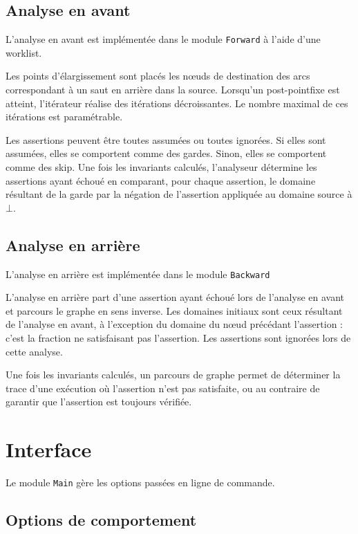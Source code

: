 \documentclass{article}
\begin{document}
\subsection{Analyse en avant}

L'analyse en avant est implémentée dans le module \verb|Forward| à
l'aide d'une worklist.

Les points d'élargissement sont placés les n\oe{}uds de
destination des arcs correspondant à un saut en arrière dans la
source. Lorsqu'un post-pointfixe est atteint, l'itérateur réalise des
itérations décroissantes. Le nombre maximal de ces itérations est
paramétrable.

Les assertions peuvent être toutes assumées ou toutes ignorées.  Si
elles sont assumées, elles se comportent comme des gardes. Sinon,
elles se comportent comme des skip. Une fois les invariants calculés,
l'analyseur détermine les assertions ayant échoué en comparant, pour chaque assertion, le
domaine résultant de la garde par la négation de l'assertion appliquée au domaine
source à $\bot$.

\subsection{Analyse en arrière}

L'analyse en arrière est implémentée dans le module \verb|Backward|

L'analyse en arrière part d'une assertion ayant échoué lors de
l'analyse en avant et parcours le graphe en sens inverse. Les
domaines initiaux sont ceux résultant de l'analyse en avant, à
l'exception du domaine du n\oe{}ud précédant l'assertion : c'est la fraction ne satisfaisant
pas l'assertion. Les assertions sont ignorées lors de cette analyse.

Une fois les invariants calculés, un parcours de graphe permet de
déterminer la trace d'une exécution où l'assertion n'est pas
satisfaite, ou au contraire de garantir que l'assertion est toujours vérifiée.

\section{Interface}

Le module \verb|Main| gère les options passées en ligne de commande.

\subsection{Options de comportement}
\end{document}
